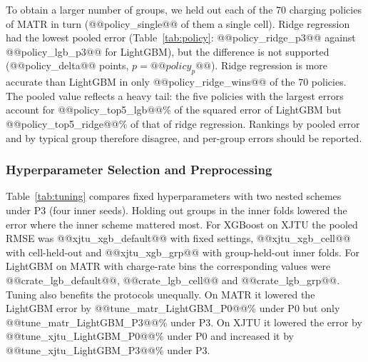 \documentclass{ieeeaccess}
\newcommand{\fitwide}[1]{\footnotesize\resizebox{\ifdim\width>\textwidth\textwidth\else\width\fi}{!}{}}
\begin{document}
To obtain a larger number of groups, we held out each of the 70 charging policies of MATR in turn (@@policy_single@@ of them a single cell). Ridge regression had the lowest pooled error (Table~\ref{tab:policy}: @@policy_ridge_p3@@ against @@policy_lgb_p3@@ for LightGBM), but the difference is not supported (@@policy_delta@@ points, $p=@@policy_p@@$). Ridge regression is more accurate than LightGBM in only @@policy_ridge_wins@@ of the 70 policies. The pooled value reflects a heavy tail: the five policies with the largest errors account for @@policy_top5_lgb@@\% of the squared error of LightGBM but @@policy_top5_ridge@@\% of that of ridge regression. Rankings by pooled error and by typical group therefore disagree, and per-group errors should be reported.
\begin{table}[!t]
\centering
\caption{MATR, F1 features: pooled RMSE (\% SOH) for P0, P2 and leave-one-charging-policy-out (P3, 70 groups), with group-held-out inner tuning, and the distribution of the P3 error over policies.}
\label{tab:policy}
\scriptsize
\fitwide{tables/policy.tex}
\end{table}

\subsubsection{Hyperparameter Selection and Preprocessing}
\label{sec:res_tuning}
\label{sec:res_selection}
Table~\ref{tab:tuning} compares fixed hyperparameters with two nested schemes under P3 (four inner seeds). Holding out groups in the inner folds lowered the error where the inner scheme mattered most. For XGBoost on XJTU the pooled RMSE was @@xjtu_xgb_default@@ with fixed settings, @@xjtu_xgb_cell@@ with cell-held-out and @@xjtu_xgb_grp@@ with group-held-out inner folds. For LightGBM on MATR with charge-rate bins the corresponding values were @@crate_lgb_default@@, @@crate_lgb_cell@@ and @@crate_lgb_grp@@. Tuning also benefits the protocols unequally. On MATR it lowered the LightGBM error by @@tune_matr_LightGBM_P0@@\% under P0 but only @@tune_matr_LightGBM_P3@@\% under P3. On XJTU it lowered the error by @@tune_xjtu_LightGBM_P0@@\% under P0 and increased it by @@tune_xjtu_LightGBM_P3@@\% under P3.
\begin{table}[!t]
\centering
\caption{P3 pooled RMSE (\% SOH): fixed hyperparameters and nested selection; mean (SD) over four inner-search seeds.}
\label{tab:tuning}
\scriptsize
\fitwide{tables/tuning.tex}
\end{table}
\end{document}
